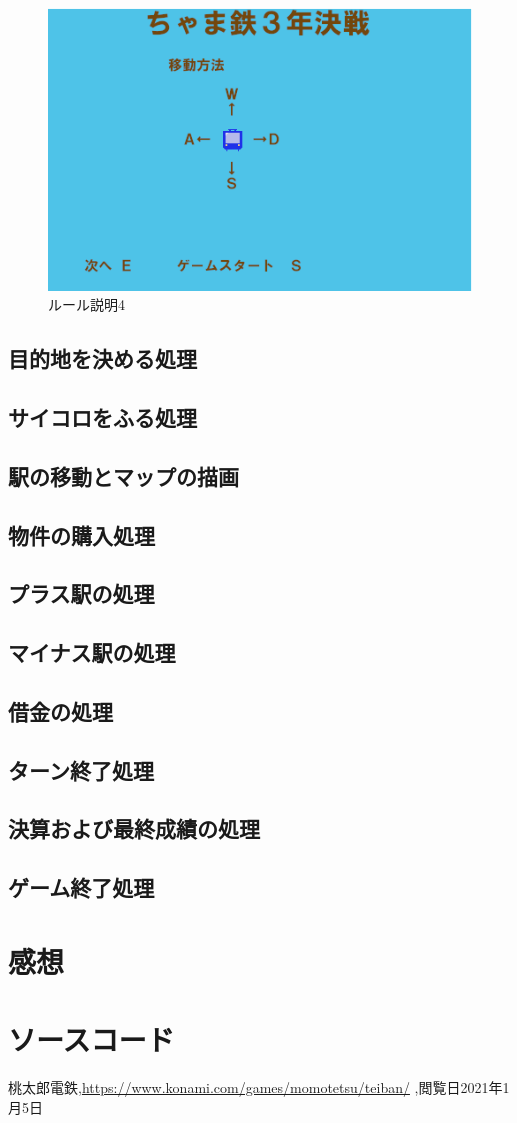 \documentclass[a4j]{jarticle}
\begin{document}
    \begin{figure}[H]
        \centering
        \includegraphics[scale=2.0]{sp8.png}
        \caption{ルール説明4}
         \label{rule4}
        \end{figure}
    \subsection{目的地を決める処理}
    \subsection{サイコロをふる処理}
    \subsection{駅の移動とマップの描画}
    \subsection{物件の購入処理}
    \subsection{プラス駅の処理}
    \subsection{マイナス駅の処理}
    \subsection{借金の処理}
    \subsection{ターン終了処理}
    \subsection{決算および最終成績の処理}
    \subsection{ゲーム終了処理}
    \section{感想}

    \section{ソースコード}


        \begin{thebibliography}{9}
            桃太郎電鉄,\url{https://www.konami.com/games/momotetsu/teiban/} ,閲覧日2021年1月5日
          \end{thebibliography}
\end{document}

